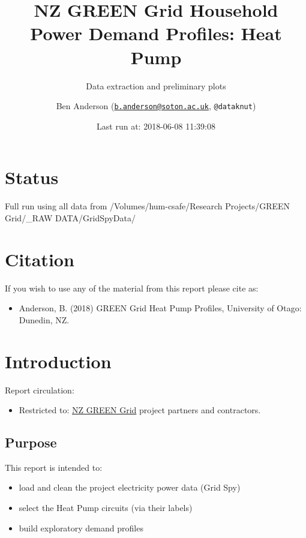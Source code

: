 \documentclass[]{article}
\title{NZ GREEN Grid Household Power Demand Profiles: Heat Pump}
\subtitle{Data extraction and preliminary plots}
\author{Ben Anderson
(\href{mailto:b.anderson@soton.ac.uk}{\nolinkurl{b.anderson@soton.ac.uk}},
\texttt{@dataknut})}
\date{Last run at: 2018-06-08 11:39:08}
\providecommand{\tightlist}{%
  \setlength{\itemsep}{0pt}\setlength{\parskip}{0pt}}
\begin{document}
\maketitle

{
\setcounter{tocdepth}{2}
\tableofcontents
}
\newpage

\section{Status}\label{status}

Full run using all data from /Volumes/hum-csafe/Research Projects/GREEN
Grid/\_RAW DATA/GridSpyData/

\section{Citation}\label{citation}

If you wish to use any of the material from this report please cite as:

\begin{itemize}
\tightlist
\item
  Anderson, B. (2018) GREEN Grid Heat Pump Profiles, University of
  Otago: Dunedin, NZ.
\end{itemize}

\newpage

\section{Introduction}\label{introduction}

Report circulation:

\begin{itemize}
\tightlist
\item
  Restricted to:
  \href{https://www.otago.ac.nz/centre-sustainability/research/energy/otago050285.html}{NZ
  GREEN Grid} project partners and contractors.
\end{itemize}

\subsection{Purpose}\label{purpose}

This report is intended to:

\begin{itemize}
\tightlist
\item
  load and clean the project electricity power data (Grid Spy)
\item
  select the Heat Pump circuits (via their labels)
\item
  build exploratory demand profiles
\end{itemize}
\end{document}
